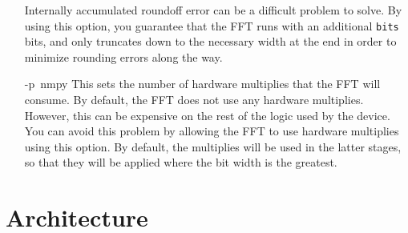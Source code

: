 \documentclass{gqtekspec}
\begin{document}
\begin{itemize}
	Internally accumulated roundoff error can be a difficult
	problem to solve.  By using this option, you guarantee that the FFT
	runs with an additional {\tt bits} bits, and only truncates down to
	the necessary width at the end in order to minimize rounding
	errors along the way.

\item[\hbox{-p nmpy}] This sets the number of hardware multiplies that the FFT
	will consume.  By default, the FFT does not use any hardware multiplies.
	However, this can be expensive on the rest of the logic used by the
	device.  You can avoid this problem by allowing the FFT to use
	hardware multiplies using this option.  By default, the multiplies will
	be used in the latter stages, so that they will be applied where
	the bit width is the greatest.
\end{itemize}

\chapter{Architecture}
\end{document}

